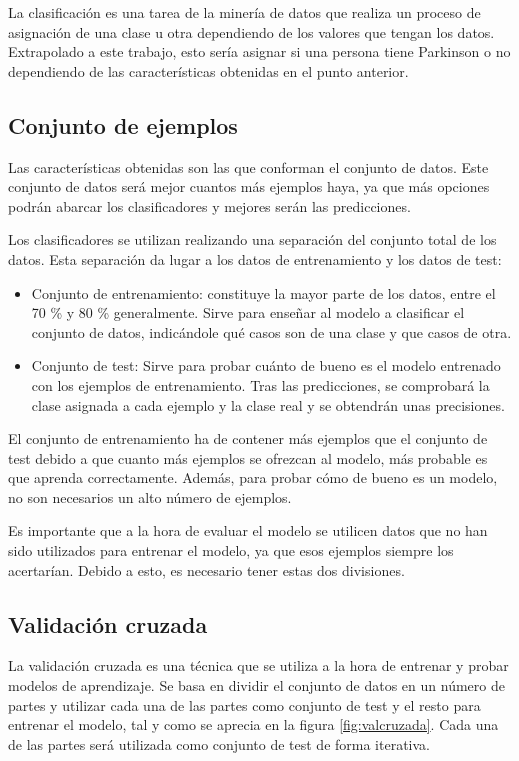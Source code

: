 La clasificación es una tarea de la minería de datos que realiza un proceso de asignación de una clase u otra dependiendo de los valores que tengan los datos. Extrapolado a este trabajo, esto sería asignar si una persona tiene Parkinson o no dependiendo de las características obtenidas en el punto anterior.

\subsection{Conjunto de ejemplos}
Las características obtenidas son las que conforman el conjunto de datos. Este conjunto de datos será mejor cuantos más ejemplos haya, ya que más opciones podrán abarcar los clasificadores y mejores serán las predicciones.

Los clasificadores se utilizan realizando una separación del conjunto total de los datos. Esta separación da lugar a los datos de entrenamiento y los datos de test:

\begin{itemize}
	\item Conjunto de entrenamiento: constituye la mayor parte de los datos, entre el 70 \% y 80 \% generalmente. Sirve para enseñar al modelo a clasificar el conjunto de datos, indicándole qué casos son de una clase y que casos de otra.
	\item Conjunto de test: Sirve para probar cuánto de bueno es el modelo entrenado con los ejemplos de entrenamiento. Tras las predicciones, se comprobará la clase asignada a cada ejemplo y la clase real y se obtendrán unas precisiones.
\end{itemize}

El conjunto de entrenamiento ha de contener más ejemplos que el conjunto de test debido a que cuanto más ejemplos se ofrezcan al modelo, más probable es que aprenda correctamente. Además, para probar cómo de bueno es un modelo, no son necesarios un alto número de ejemplos.

Es importante que a la hora de evaluar el modelo se utilicen datos que no han sido utilizados para entrenar el modelo, ya que esos ejemplos siempre los acertarían. Debido a esto, es necesario tener estas dos divisiones.

\subsection{Validación cruzada}
La validación cruzada es una técnica que se utiliza a la hora de entrenar y probar modelos de aprendizaje. Se basa en dividir el conjunto de datos en un número de partes y utilizar cada una de las partes como conjunto de test y el resto para entrenar el modelo, tal y como se aprecia en la figura \ref{fig:valcruzada}. Cada una de las partes será utilizada como conjunto de test de forma iterativa.

